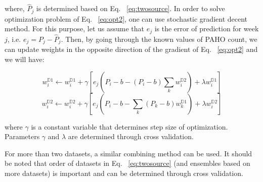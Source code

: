 

where, $\hat{P}_j$ is determined based on Eq. ~\ref{eq:twosource}. In order to solve optimization problem of Eq. ~\ref{eq:opt2}, one can use stochastic gradient decent method. For this purpose, let us assume that $e_j$ is the error of prediction for week $j$, i.e. $e_j = P_j - \hat{P}_j$. Then, by going through the known values of PAHO count, we can update weights in the opposite direction of the gradient of Eq. ~\ref{eq:opt2} and we will have:

\begin{equation}
w_{i}^{\mathbb{D}1} \leftarrow w_{i}^{\mathbb{D}1}+ \gamma \left [e_j(P_i - b - (P_i - b) \sum_{k}{}{w_{i}^{\mathbb{D}2}}) + \lambda w_{i}^{\mathbb{D}1}  \right ]
\end{equation}
\begin{equation}
w_{i}^{\mathbb{D}2} \leftarrow w_{i}^{\mathbb{D}2}+ \gamma \left [e_j(P_i - b - \sum_{k}{}{(P_k - b)w_{k}^{\mathbb{D}1}}) + \lambda w_{i}^{\mathbb{D}2}  \right ]
\end{equation}

where $\gamma$ is a constant variable that determines step size of optimization. Parameters $\gamma$ and $\lambda$ are determined through cross validation.

For more than two datasets, a similar combining method can be used. It should be noted that order of datasets in Eq. ~\ref{eq:twosource} (and ensembles based on more datasets) is important and can be determined through cross validation.

